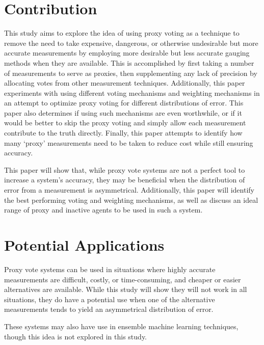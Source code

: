 \section{Contribution}\label{sec:contribution}
This study aims to explore the idea of using proxy voting as a technique to remove the
need to take expensive, dangerous, or otherwise undesirable but more accurate
measurements by employing more desirable but less accurate gauging methods when they
are available.
This is accomplished by first taking a number of measurements to serve as proxies, then
supplementing any lack of precision by allocating votes from other measurement
techniques.
Additionally, this paper experiments with using different voting mechanisms and
weighting mechanisms in an attempt to optimize proxy voting for different
distributions of error.
This paper also determines if using such mechanisms are even worthwhile, or if it
would be better to skip the proxy voting and simply allow each measurement contribute
to the truth directly.
Finally, this paper attempts to identify how many `proxy' measurements need
to be taken to reduce cost while still ensuring accuracy.

This paper will show that, while proxy vote systems are not a perfect tool to
increase a system's accuracy, they may be beneficial when the distribution of error
from a measurement is asymmetrical.
Additionally, this paper will identify the best performing voting and weighting
mechanisms, as well as discuss an ideal range of proxy and inactive agents to be used
in such a system.


\section{Potential Applications}\label{sec:potential-applications}
Proxy vote systems can be used in situations where highly accurate measurements are
difficult, costly, or time-consuming, and cheaper or easier alternatives are available.
While this study will show they will not work in all situations, they do have a
potential use when one of the alternative measurements tends to yield an asymmetrical
distribution of error.

These systems may also have use in ensemble machine learning techniques, though this
idea is not explored in this study.
